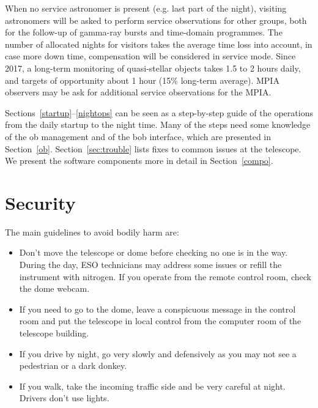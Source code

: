 \documentclass[11pt,fleqn]{book} %
\begin{document}
When no service astronomer is present (e.g. last part of the night), visiting astronomers will be asked to perform service observations for other groups, both for the follow-up of gamma-ray bursts and time-domain programmes.  The number of allocated nights for visitors takes the average time loss into account, in case more down time, compensation will be considered in service mode.  Since 2017, a long-term monitoring of quasi-stellar objects takes 1.5 to 2 hours daily, and targets of opportunity about 1 hour (15\% long-term average).  MPIA observers may be ask for additional service observations for the MPIA.

Sections~\ref{startup}--\ref{nightops} can be seen as a step-by-step guide of the operations from the daily startup to the night time. Many of the steps need some knowledge of the \gls{ob} management and of the \gls{bob} interface, which
are presented in Section~\ref{ob}.  Section~\ref{sec:trouble} lists fixes to common issues at the telescope.  We present the software components more in detail in Section~\ref{compo}.

\section{Security}

The main guidelines to avoid bodily harm are:
\begin{itemize}
\item Don't move the telescope or dome before checking no one is in the way.  During the day, ESO technicians may address some issues or refill the instrument with nitrogen.  If you operate from the remote control room, check the dome webcam.
\item If you need to go to the dome, leave a conspicuous message in the control room and put the telescope in local control from the computer room of the telescope building.
\item If you drive by night, go very slowly and defensively as you may not see a pedestrian or a dark donkey.  
\item If you walk, take the incoming traffic side and be very careful at night. Drivers don't use lights.
\end{itemize}
\end{document}
